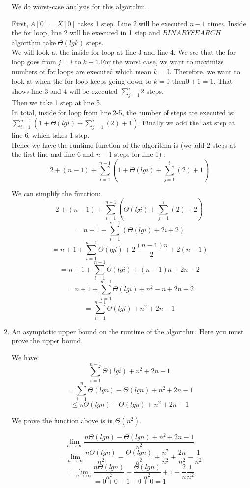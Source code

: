\documentclass{cpsc413Solutions}
\begin{document}
\begin{problemlist}
\begin{problem}
\begin{answer}
\begin{enumerate}
    We do worst-case analysis for this algorithm. 
    
    First, $A[0] = X[0]$ takes 1 step.
    Line 2 will be executed $n-1$ times.
    Inside the for loop, line 2 will be executed in 1 step and $BINARYSEARCH$ algorithm take $\Theta(lgk)$ steps.\\
    We will look at the inside for loop at line 3 and line 4. We see that the for loop goes from $j=i$ to $k+1$.For the worst case, we want to maximize numbers of for loops are executed which mean $k=0$. Therefore, we want to look at when the for loop keeps going down to $k=0$ then$0+1=1$. That shows line 3 and 4 will be executed $\sum_{j=1}^i 2$ steps. \\
    Then we take 1 step at line 5.\\
    In total, inside for loop from line 2-5, the number of steps are executed is:
    $\sum_{i=1}^{n-1}(1+\Theta(lgi) + \sum_{j=1}^i(2)+1)$.
    Finally we add the last step at line 6, which takes 1 step.\\
    Hence we have the runtime function of the algorithm is (we add 2 steps at the first line and line 6 and $n-1$ steps for line 1) :
    \begin{equation}
       2 + (n-1) +  \sum_{i=1}^{n-1}(1+\Theta(lg i) + \sum_{j=1}^i(2)+1)
    \end{equation}
    
    We can simplify the function:
    $$ 2 +(n-1) +  \sum_{i=1}^{n-1}(\Theta(lgi) + \sum_{j=1}^i(2)+2)$$
    $$= n+1 +  \sum_{i=1}^{n-1}(\Theta(lgi) + 2i+2)$$
    $$= n+1 + \sum_{i=1}^{n-1} \Theta(lgi) + 2 \frac{(n-1)n}{2}+ 2(n-1)$$
    $$= n+1 +\sum_{i=1}^{n-1}\Theta(lgi) + (n-1)n +2n-2$$
    $$= n+1 +\sum_{i=1}^{n-1}\Theta(lgi) + n^2-n +2n-2$$
    $$= \sum_{i=1}^{n-1}\Theta(lgi) + n^2+2n-1$$
    
    \item An asymptotic upper bound on the runtime of the algorithm. Here you must prove the upper bound.
    
      We have:
    $$\sum_{i=1}^{n-1}\Theta(lgi) + n^2+2n-1$$
    $$= \sum_{i=1}^{n}\Theta(lgn) - \Theta(lgn)+ n^2+2n-1$$
    $$ \leq n\Theta(lgn) -\Theta(lgn) + n^2+2n-1$$
    
    We prove the function above is in $\Theta(n^2)$.
    
    $$\lim_{n\to\infty} \frac{n\Theta(lgn) -\Theta(lgn) + n^2+2n-1}{n^2} $$
    $$= \lim_{n\to\infty } \frac{n\Theta(lgn)}{n^2} -\frac{\Theta(lgn)}{n^2}+ \frac{n^2}{n^2} +\frac{2n}{n^2} - \frac{1}{n^2}$$
    $$= \lim_{n\to \infty} \frac{n\Theta(lgn)}{n^2}-\frac{\Theta(lgn)}{n^2}+ 1 + \frac{2}{n} \frac{1}{n^2}$$
    $$=0+0+1+0+0 = 1$$
    

\end{enumerate}
\end{answer}
\end{problem}
\end{problemlist}
\end{document}
